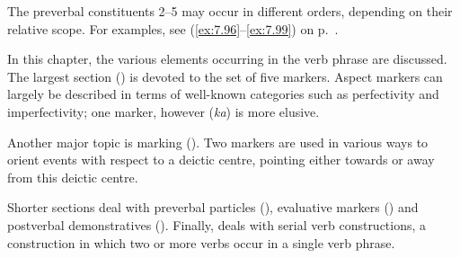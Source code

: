 \begin{table}
\caption{The verb phrase: postverbal elements}
\label{tab:45}
\end{table}
The preverbal constituents 2–5 may occur in different orders, depending on their relative scope. For examples, see (\ref{ex:7.96}–\ref{ex:7.99}) on p.~\pageref{ex:7.99}. 

In this chapter, the various elements occurring in the verb phrase are discussed. The largest section () is devoted to the set of five  markers. Aspect markers can largely be described in terms of well-known categories such as perfectivity and imperfectivity; one marker, however (\textit{ka}) is more elusive. 

Another major topic is  marking (). Two  markers are used in various ways to orient events with respect to a deictic centre, pointing either towards or away from this deictic centre.

Shorter sections deal with preverbal particles (), evaluative markers () and postverbal demonstratives (). Finally,  deals with serial verb constructions, a construction in which two or more verbs occur in a single verb phrase.

